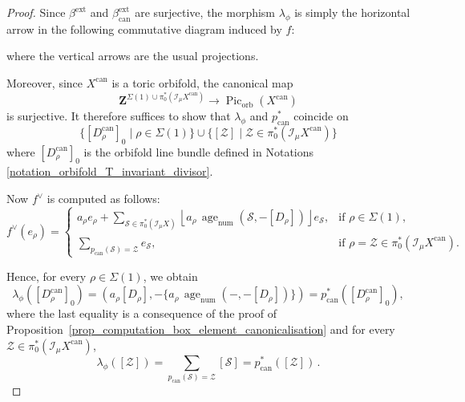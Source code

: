 \documentclass{proc-l}
\newcommand{\Z}{\mathbf{Z}}
\newcommand{\I}{\mathcal{I}}
\DeclareMathOperator{\Pic}{Pic}
\DeclareMathOperator{\can}{can}
\DeclareMathOperator{\num}{num}
\DeclareMathOperator{\age}{age}
\DeclareMathOperator{\orb}{orb}
\DeclareMathOperator{\ext}{ext}
\newcommand{\stackZ}{\mathcal{Z}}
\newcommand{\stackS}{\mathcal{S}}
\newcommand{\sheafI}{\mathcal{I}}
\newcommand{\twistsector}{\pi_0^*(\sheafI_{\mu} X)}
\theoremstyle{definition}
\theoremstyle{remark}
\numberwithin{equation}{section}
\begin{document}
\begin{proof}
Since $\beta^{\ext}$ and $\beta^{\ext}_{\can}$ are surjective, the morphism $\lambda_{\phi}$ is simply the horizontal arrow in the following commutative diagram induced by $f$:
\begin{center}
\end{center}
where the vertical arrows are the usual projections.

Moreover, since $X^{\can}$ is a toric orbifold, the canonical map
$$
\Z^{\Sigma(1) \cup \pi_0^*(\I_{\mu} X^{\can})}
\longrightarrow
\Pic_{\orb}(X^{\can})
$$
is surjective. It therefore suffices to show that $\lambda_{\phi}$ and $p_{\can}^*$ coincide on
$$
\{ [D_{\rho}^{\can}]_0 \mid \rho \in \Sigma(1) \}
\cup
\{ [\stackZ] \mid \stackZ \in \pi_0^*(\I_{\mu} X^{\can}) \}
$$where $[D_{\rho}^{\can}]_0$ is the orbifold line bundle defined in Notations \ref{notation_orbifold_T_invariant_divisor}.

Now $f^{\vee}$ is computed as follows:
\[
f^{\vee}(e_{\rho}) =
\begin{cases}
\displaystyle
a_{\rho} e_{\rho}
+
\sum_{\stackS \in \twistsector}
\left\lfloor
a_{\rho}\,\age_{\num}\!\left(\stackS,-[D_{\rho}]\right)
\right\rfloor e_{\stackS},
& \text{if } \rho \in \Sigma(1), \\[1.6em]

\displaystyle
\sum_{p_{\can}(\stackS)=\stackZ}
e_{\stackS},
& \text{if } \rho = \stackZ \in \pi_0^*(\I_{\mu} X^{\can}).
\end{cases}
\]

Hence, for every $\rho \in \Sigma(1)$, we obtain
$$
\lambda_{\phi}([D_{\rho}^{\can}]_0)
=
\left(
a_{\rho}[D_{\rho}],
-
\{a_{\rho}\,\age_{\num}\!\left(-,-[D_{\rho}]\right)\}
\right)
=
p_{\can}^*([D_{\rho}^{\can}]_0),
$$where the last equality is a consequence of the proof of Proposition~\ref{prop_computation_box_element_canonicalisation}
and for every $\stackZ \in \pi_0^*(\I_{\mu} X^{\can})$,
$$
\lambda_{\phi}([\stackZ])
=
\sum_{p_{\can}(\stackS)=\stackZ} [\stackS]
=
p_{\can}^*([\stackZ]) \, .
$$
    
\end{proof}
\end{document}
